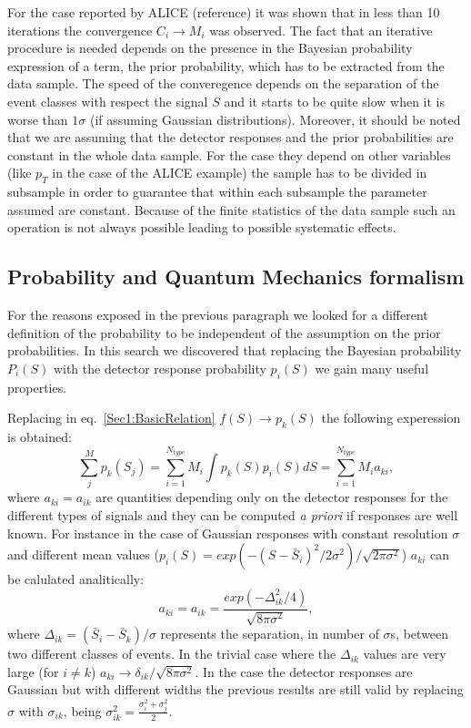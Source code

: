 For the case reported by ALICE (reference) it was shown that in less than 10 iterations the convergence $C_{i} \rightarrow M_{i}$ was observed.
The fact that an iterative procedure is needed depends on the presence in the
Bayesian probability expression of a term, the prior probability, which has to
be extracted from the data sample. The speed of the converegence depends on
the separation of the event classes with respect the signal $S$ and it starts
to be quite slow when it is worse than $1\sigma$ (if assuming Gaussian distributions).
Moreover, it should be noted that we are assuming that the detector responses and the prior probabilities are constant in the whole data sample.
For the case they depend on other variables (like $p_{T}$ in the case of the ALICE example) the sample has to be divided in subsample in order to guarantee that within each subsample the parameter assumed are constant. Because of the finite statistics of the data sample such an operation is not always possible leading to possible systematic effects.

\subsection{Probability and Quantum Mechanics formalism}
For the reasons exposed in the previous paragraph we looked for a different
definition of the probability to be independent of the assumption on the prior
probabilities. In this search we discovered that replacing the Bayesian
probability $P_{i}(S)$ with the detector response probability $p_{i}(S)$ 
we gain many useful properties.

Replacing in eq.~\ref{Sec1:BasicRelation} $f(S) \rightarrow p_{k}(S)$ the
following experession is obtained:
\begin{equation}
\label{Sec1:QSmain}
\sum\limits_{j}^{M}p_{k}(S_j) = \sum\limits_{i=1}^{N_{type}}M_{i}\int p_{k}(S)
p_{i}(S) dS = \sum\limits_{i=1}^{N_{type}}M_{i} a_{ki}, 
\end{equation}
where $a_{ki}=a_{ik}$ are quantities depending only on the detector responses
for the different types of signals and they can be computed {\it a priori} if responses are well known.
For instance in the case of Gaussian responses with constant resolution
$\sigma$ and different mean values ($p_{i}(S) =
exp(-(S-\bar{S}_{i})^{2}/2\sigma^{2})/\sqrt{2\pi\sigma^{2}}$) $a_{ki}$ can
be calulated analitically:
\begin{equation}
\label{Sec1:GaussianMatrixElements}
a_{ki} = a_{ik} = \frac{exp(-\Delta_{ik}^{2}/4)}{\sqrt{8\pi\sigma^2}},
\end{equation}
where $\Delta_{ik}=(\bar{S}_{i} - \bar{S}_{k})/\sigma$ represents the
separation, in number of $\sigma$s, between two different classes of events.
In the trivial case where the $\Delta_{ik}$ values are very large (for $i \neq
k$) $a_{ki} \rightarrow \delta_{ik} / \sqrt{8\pi\sigma^2}$.
In the case the detector responses are Gaussian but with different
widths the previous results are still valid by replacing $\sigma$ with
$\sigma_{ik}$,  being $\sigma_{ik}^2 = \frac{\sigma_{i}^2 + \sigma_{j}^2}{2}$.

